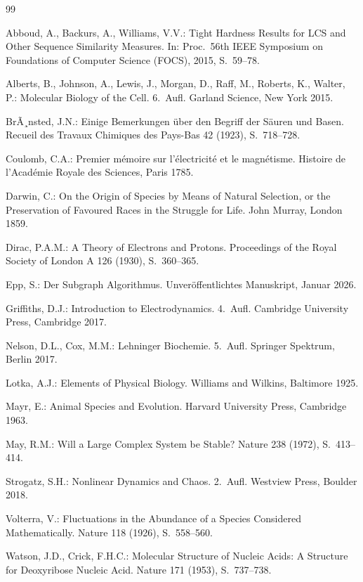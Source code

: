 ﻿\documentclass[a4paper,12pt]{article}
\theoremstyle{definition}
\begin{document}
\begin{thebibliography}{99}

Abboud, A., Backurs, A., Williams, V.V.:
Tight Hardness Results for LCS and Other Sequence Similarity Measures.
In: Proc.\ 56th IEEE Symposium on Foundations of Computer Science (FOCS), 2015, S.~59--78.

Alberts, B., Johnson, A., Lewis, J., Morgan, D., Raff, M., Roberts, K., Walter, P.:
Molecular Biology of the Cell. 6.~Aufl.
Garland Science, New York 2015.

BrÃ¸nsted, J.N.:
Einige Bemerkungen über den Begriff der Säuren und Basen.
Recueil des Travaux Chimiques des Pays-Bas 42 (1923), S.~718--728.

Coulomb, C.A.:
Premier mémoire sur l'électricité et le magnétisme.
Histoire de l'Académie Royale des Sciences, Paris 1785.

Darwin, C.:
On the Origin of Species by Means of Natural Selection, or the Preservation of
Favoured Races in the Struggle for Life.
John Murray, London 1859.

Dirac, P.A.M.:
A Theory of Electrons and Protons.
Proceedings of the Royal Society of London A 126 (1930), S.~360--365.

Epp, S.:
Der Subgraph Algorithmus.
Unveröffentlichtes Manuskript, Januar 2026.

Griffiths, D.J.:
Introduction to Electrodynamics. 4.~Aufl.
Cambridge University Press, Cambridge 2017.

Nelson, D.L., Cox, M.M.:
Lehninger Biochemie. 5.~Aufl.
Springer Spektrum, Berlin 2017.

Lotka, A.J.:
Elements of Physical Biology.
Williams and Wilkins, Baltimore 1925.

Mayr, E.:
Animal Species and Evolution.
Harvard University Press, Cambridge 1963.

May, R.M.:
Will a Large Complex System be Stable?
Nature 238 (1972), S.~413--414.

Strogatz, S.H.:
Nonlinear Dynamics and Chaos. 2.~Aufl.
Westview Press, Boulder 2018.

Volterra, V.:
Fluctuations in the Abundance of a Species Considered Mathematically.
Nature 118 (1926), S.~558--560.

Watson, J.D., Crick, F.H.C.:
Molecular Structure of Nucleic Acids: A Structure for Deoxyribose Nucleic Acid.
Nature 171 (1953), S.~737--738.


\end{thebibliography}
\end{document}
